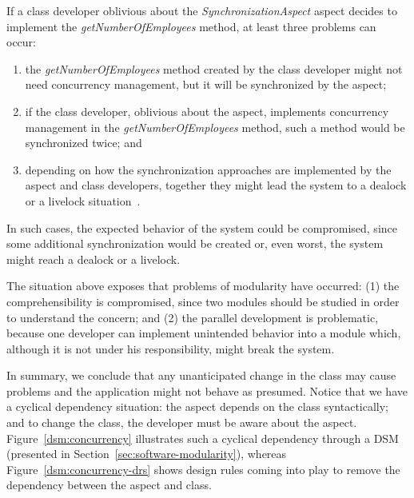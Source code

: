 If a class developer oblivious about the
\emph{SynchronizationAspect} aspect decides to implement the
\emph{getNumberOfEmployees} method, at least three problems can
occur:

\begin{enumerate}

    \item the \emph{getNumberOfEmployees} method created by the class
    developer might not need concurrency management, but it will be
    synchronized by the aspect;

    \item if the class developer, oblivious about the aspect,
    implements concurrency management in the \emph{getNumberOfEmployees} method,
    such a method would be synchronized twice; and

    \item depending on how the synchronization approaches are implemented
    by the aspect and class developers, together they might lead the system
    to a dealock or a livelock situation~\cite{lea-java-coop-1999}.

\end{enumerate}

In such cases, the expected behavior of the system could be
compromised, since some additional synchronization would be created
or, even worst, the system might reach a dealock or a livelock.

The situation above exposes that problems of modularity have
occurred: (1) the comprehensibility is compromised, since two
modules should be studied in order to understand the concern; and
(2) the parallel development is problematic, because one developer
can implement unintended behavior into a module which, although it
is not under his responsibility, might break the system.

In summary, we conclude that any unanticipated change in the class
may cause problems and the application might not behave as presumed.
Notice that we have a cyclical dependency situation: the aspect
depends on the class syntactically; and to change the class, the
developer must be aware about the aspect.
Figure~\ref{dsm:concurrency} illustrates such a cyclical
dependency through a DSM (presented in Section~\ref{sec:software-modularity}), whereas
Figure~\ref{dsm:concurrency-drs} shows design rules coming into
play to remove the dependency between the aspect and class.

